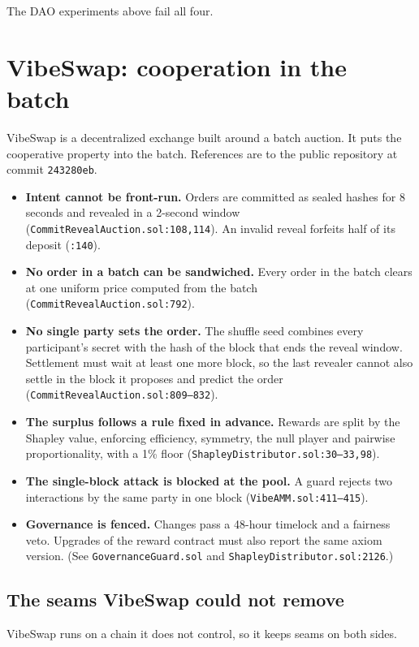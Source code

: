 \documentclass[11pt]{article}
\begin{document}
\noindent The DAO experiments above fail all four.

\section{VibeSwap: cooperation in the batch}

VibeSwap is a decentralized exchange built around a batch auction. It puts the cooperative property into the batch. References are to the public repository at commit \texttt{243280eb}.

\begin{itemize}
\item \textbf{Intent cannot be front-run.} Orders are committed as sealed hashes for 8 seconds and revealed in a 2-second window (\texttt{CommitRevealAuction.sol:108,114}). An invalid reveal forfeits half of its deposit (\texttt{:140}).
\item \textbf{No order in a batch can be sandwiched.} Every order in the batch clears at one uniform price computed from the batch (\texttt{CommitRevealAuction.sol:792}).
\item \textbf{No single party sets the order.} The shuffle seed combines every participant's secret with the hash of the block that ends the reveal window. Settlement must wait at least one more block, so the last revealer cannot also settle in the block it proposes and predict the order (\texttt{CommitRevealAuction.sol:809--832}).
\item \textbf{The surplus follows a rule fixed in advance.} Rewards are split by the Shapley value, enforcing efficiency, symmetry, the null player and pairwise proportionality, with a 1\% floor (\texttt{ShapleyDistributor.sol:30--33,98}).
\item \textbf{The single-block attack is blocked at the pool.} A guard rejects two interactions by the same party in one block (\texttt{VibeAMM.sol:411--415}).
\item \textbf{Governance is fenced.} Changes pass a 48-hour timelock and a fairness veto. Upgrades of the reward contract must also report the same axiom version. (See \texttt{GovernanceGuard.sol} and \texttt{ShapleyDistributor.sol:2126}.)
\end{itemize}

\subsection{The seams VibeSwap could not remove}

VibeSwap runs on a chain it does not control, so it keeps seams on both sides.
\end{document}
